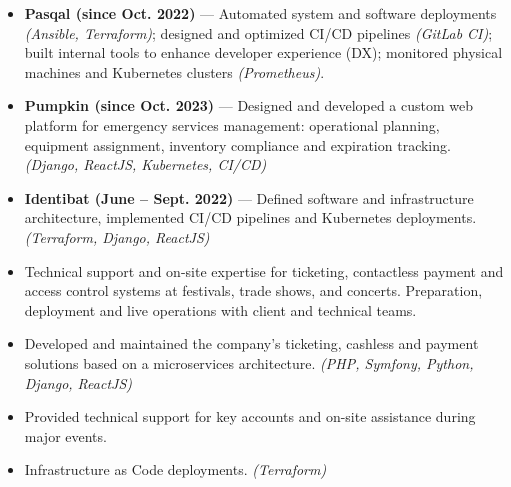 
\begin{itemize}
    \item \textbf{Pasqal (since Oct. 2022)} — Automated system and software deployments \textit{(Ansible, Terraform)}; designed and optimized CI/CD pipelines \textit{(GitLab CI)}; built internal tools to enhance developer experience (DX); monitored physical machines and Kubernetes clusters \textit{(Prometheus)}.
    \item \textbf{Pumpkin (since Oct. 2023)} — Designed and developed a custom web platform for emergency services management: operational planning, equipment assignment, inventory compliance and expiration tracking. \textit{(Django, ReactJS, Kubernetes, CI/CD)}
    \item \textbf{Identibat (June – Sept. 2022)} — Defined software and infrastructure architecture, implemented CI/CD pipelines and Kubernetes deployments. \textit{(Terraform, Django, ReactJS)}
\end{itemize}

\divider

\begin{itemize}
    \item Technical support and on-site expertise for ticketing, contactless payment and access control systems at festivals, trade shows, and concerts. Preparation, deployment and live operations with client and technical teams.
\end{itemize}

\divider

\begin{itemize}
    \item Developed and maintained the company’s ticketing, cashless and payment solutions based on a microservices architecture. \textit{(PHP, Symfony, Python, Django, ReactJS)}
    \item Provided technical support for key accounts and on-site assistance during major events.
    \item Infrastructure as Code deployments. \textit{(Terraform)}
\end{itemize}

\divider

